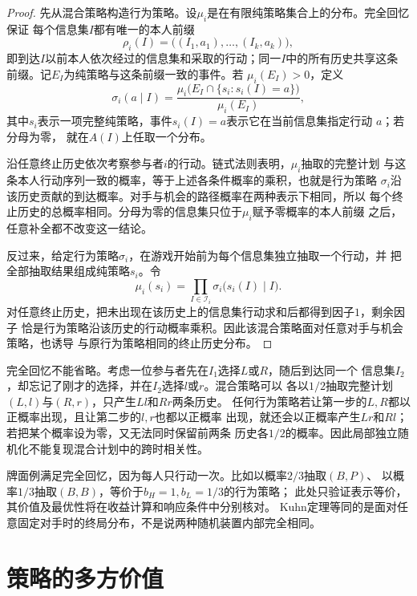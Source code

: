 \begin{proof}
先从混合策略构造行为策略。设\(\mu_i\)是在有限纯策略集合上的分布。完全回忆保证
每个信息集\(I\)都有唯一的本人前缀
\[
  \rho_i(I)
  =
  \bigl((I_1,a_1),\ldots,(I_k,a_k)\bigr),
\]
即到达\(I\)以前本人依次经过的信息集和采取的行动；同一\(I\)中的所有历史共享这条
前缀。记\(E_I\)为纯策略与这条前缀一致的事件。若
\(\mu_i(E_I)>0\)，定义
\[
  \sigma_i(a\mid I)
  =
  \frac{
    \mu_i\bigl(E_I\cap\{s_i:s_i(I)=a\}\bigr)
  }{
    \mu_i(E_I)
  },
\]
其中\(s_i\)表示一项完整纯策略，事件\(s_i(I)=a\)表示它在当前信息集指定行动
\(a\)；若分母为零，
就在\(A(I)\)上任取一个分布。

沿任意终止历史依次考察参与者\(i\)的行动。链式法则表明，\(\mu_i\)抽取的完整计划
与这条本人行动序列一致的概率，等于上述各条件概率的乘积，也就是行为策略
\(\sigma_i\)沿该历史贡献的到达概率。对手与机会的路径概率在两种表示下相同，所以
每个终止历史的总概率相同。分母为零的信息集只位于\(\mu_i\)赋予零概率的本人前缀
之后，任意补全都不改变这一结论。

反过来，给定行为策略\(\sigma_i\)，在游戏开始前为每个信息集独立抽取一个行动，并
把全部抽取结果组成纯策略\(s_i\)。令
\[
  \mu_i(s_i)
  =
  \prod_{I\in\mathcal{I}_i}
  \sigma_i\bigl(s_i(I)\mid I\bigr).
\]
对任意终止历史，把未出现在该历史上的信息集行动求和后都得到因子\(1\)，剩余因子
恰是行为策略沿该历史的行动概率乘积。因此该混合策略面对任意对手与机会策略，也诱导
与原行为策略相同的终止历史分布。
\end{proof}

完全回忆不能省略。考虑一位参与者先在\(I_1\)选择\(L\)或\(R\)，随后到达同一个
信息集\(I_2\)，却忘记了刚才的选择，并在\(I_2\)选择\(l\)或\(r\)。混合策略可以
各以\(1/2\)抽取完整计划\((L,l)\)与\((R,r)\)，只产生\(Ll\)和\(Rr\)两条历史。
任何行为策略若让第一步的\(L,R\)都以正概率出现，且让第二步的\(l,r\)也都以正概率
出现，就还会以正概率产生\(Lr\)和\(Rl\)；若把某个概率设为零，又无法同时保留前两条
历史各\(1/2\)的概率。因此局部独立随机化不能复现混合计划中的跨时相关性。

牌面例满足完全回忆，因为每人只行动一次。比如以概率\(2/3\)抽取\((B,P)\)、
以概率\(1/3\)抽取\((B,B)\)，等价于\(b_H=1,b_L=1/3\)的行为策略；
此处只验证表示等价，其价值及最优性将在收益计算和响应条件中分别核对。
Kuhn定理等同的是面对任意固定对手时的终局分布，不是说两种随机装置内部完全相同。

\section{策略的多方价值}
\label{sec:game-multiparty-value}

